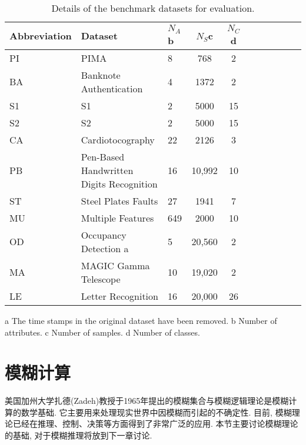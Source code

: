 \begin{table*}[!ht]
\caption{Details of the benchmark datasets for evaluation.}
\begin{center}
 \begin{tabular}{lp{8cm}lcccccccc}
\toprule
Abbreviation& Dataset& $N_A$b &$N_S$c &$N_C$d \\
\hline
PI& PIMA \cite{SmithEverhart1988-5692} &8& 768& 2\\
BA& Banknote Authentication \cite{LohwegHoffmann2013-5693}& 4 &1372 &2\\
S1& S1 \cite{FrantiVirmajoki2006-5694}& 2 &5000 &15\\
S2& S2 \cite{FrantiVirmajoki2006-5694}&2 &5000 &15\\
CA& Cardiotocography \cite{AyreseCamposBernardes2000-5695}& 22& 2126& 3\\
PB& Pen-Based Handwritten Digits Recognition \cite{AlimogluAlpaydin1996-5696}& 16 &10,992& 10\\
ST& Steel Plates Faults \cite{Buscema1998-5698}& 27 &1941 &7\\
MU& Multiple Features \cite{ARJain2000-5703} &649 &2000& 10\\
OD& Occupancy Detection \cite{CandanedoFeldheim2016-5699}a& 5 &20,560& 2\\
MA& MAGIC Gamma Telescope \cite{BockChilingarian2004-5701}& 10 &19,020& 2\\
LE& Letter Recognition \cite{FreySlate1991-5702} &16 &20,000 &26\\
\bottomrule
\end{tabular}
\end{center}
\label{TT2-ELM170610:Sec5-3-1}
\end{table*}
a The time stamps in the original dataset have been removed.
b Number of attributes.
c Number of samples.
d Number of classes.
\section{模糊计算}
美国加州大学扎德(Zadeh)教授于1965年提出的模糊集合与模糊逻辑理论是模糊计算的数学基础. 它主要用来处理现实世界中因模糊而引起的不确定性. 目前, 模糊理论已经在推理、控制、决策等方面得到了非常广泛的应用. 本节主要讨论模糊理论的基础, 对于模糊推理将放到下一章讨论.

